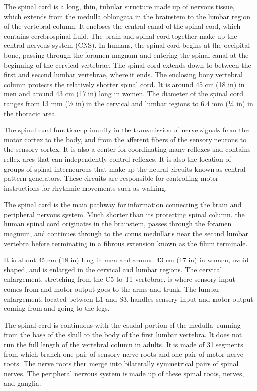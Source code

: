 The spinal cord is a long, thin, tubular structure made up of nervous tissue, which extends from the medulla oblongata in the brainstem to the lumbar region of the vertebral column. It encloses the central canal of the spinal cord, which contains cerebrospinal fluid. The brain and spinal cord together make up the central nervous system (CNS). In humans, the spinal cord begins at the occipital bone, passing through the foramen magnum and entering the spinal canal at the beginning of the cervical vertebrae. The spinal cord extends down to between the first and second lumbar vertebrae, where it ends. The enclosing bony vertebral column protects the relatively shorter spinal cord. It is around 45 cm (18 in) in men and around 43 cm (17 in) long in women. The diameter of the spinal cord ranges from 13 mm (1⁄2 in) in the cervical and lumbar regions to 6.4 mm (1⁄4 in) in the thoracic area.

The spinal cord functions primarily in the transmission of nerve signals from the motor cortex to the body, and from the afferent fibers of the sensory neurons to the sensory cortex. It is also a center for coordinating many reflexes and contains reflex arcs that can independently control reflexes. It is also the location of groups of spinal interneurons that make up the neural circuits known as central pattern generators. These circuits are responsible for controlling motor instructions for rhythmic movements such as walking.

The spinal cord is the main pathway for information connecting the brain and peripheral nervous system. Much shorter than its protecting spinal column, the human spinal cord originates in the brainstem, passes through the foramen magnum, and continues through to the conus medullaris near the second lumbar vertebra before terminating in a fibrous extension known as the filum terminale.

It is about 45 cm (18 in) long in men and around 43 cm (17 in) in women, ovoid-shaped, and is enlarged in the cervical and lumbar regions. The cervical enlargement, stretching from the C5 to T1 vertebrae, is where sensory input comes from and motor output goes to the arms and trunk. The lumbar enlargement, located between L1 and S3, handles sensory input and motor output coming from and going to the legs.

The spinal cord is continuous with the caudal portion of the medulla, running from the base of the skull to the body of the first lumbar vertebra. It does not run the full length of the vertebral column in adults. It is made of 31 segments from which branch one pair of sensory nerve roots and one pair of motor nerve roots. The nerve roots then merge into bilaterally symmetrical pairs of spinal nerves. The peripheral nervous system is made up of these spinal roots, nerves, and ganglia.

